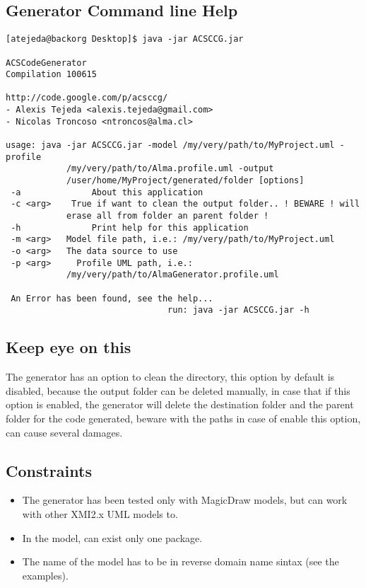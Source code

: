 \subsection {Generator Command line Help} 
\begin{verbatim}
[atejeda@backorg Desktop]$ java -jar ACSCCG.jar 

ACSCodeGenerator
Compilation 100615

http://code.google.com/p/acsccg/
- Alexis Tejeda <alexis.tejeda@gmail.com>
- Nicolas Troncoso <ntroncos@alma.cl>

usage: java -jar ACSCCG.jar -model /my/very/path/to/MyProject.uml -profile
            /my/very/path/to/Alma.profile.uml -output
            /user/home/MyProject/generated/folder [options]
 -a              About this application
 -c <arg>    True if want to clean the output folder.. ! BEWARE ! will
            erase all from folder an parent folder !
 -h              Print help for this application
 -m <arg>   Model file path, i.e.: /my/very/path/to/MyProject.uml
 -o <arg>   The data source to use
 -p <arg>     Profile UML path, i.e.:
            /my/very/path/to/AlmaGenerator.profile.uml

 An Error has been found, see the help...
                                run: java -jar ACSCCG.jar -h

\end{verbatim}

\subsection {Keep eye on this} 
The generator has an option to clean the directory, this option by default is
disabled, because the output folder can be deleted manually, in case that if
this option is enabled, the generator will delete the destination folder and the
parent folder for the code generated, beware with the paths in case of enable
this option, can cause several damages.

\subsection {Constraints} 
\begin{itemize}
  \item The generator has been tested only with MagicDraw models, but can work
  with other XMI2.x UML models to.
  \item In the model, can exist only one package.
  \item The name of the model has to be in reverse domain name sintax (see the
  examples).
\end{itemize}